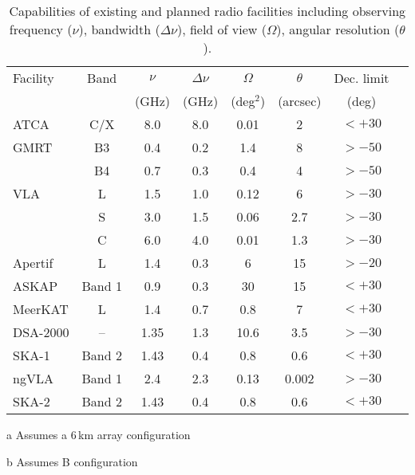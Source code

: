 \begin{table*}
    \caption[Current and future radio interferometer specifications]{Capabilities of existing and planned radio facilities including observing frequency ($\nu$), bandwidth ($\Delta\nu$), field of view ($\Omega$), angular resolution ($\theta$).}
    \label{tab:radio_facilities}
    \centering
    \begin{threeparttable}
    \begin{tabular}{lcS[table-format=1.2]S[table-format=1.1]S[table-format=2.2]S[table-format=2.3]cc}
    \hline\hline
    Facility & Band & $\nu$ & $\Delta\nu$ & $\Omega$ & $\theta$ & Dec. limit\\
     & & {(GHz)} & {(GHz)} & {(deg$^2$)} & {(arcsec)} & (deg)\\
    \hline
    ATCA &  C/X & 8.0 & 8.0 & 0.01 & 2 & $<+30$\\
    GMRT & B3 & 0.4 & 0.2 & 1.4 & 8 & $>-50$\\
    ~ & B4 & 0.7 & 0.3 & 0.4 & 4 & $>-50$\\
    VLA & L & 1.5 & 1.0 & 0.12 & 6 & $>-30$\\
    ~ & S & 3.0 & 1.5 & 0.06 & 2.7 & $>-30$\\
    ~ & C & 6.0 & 4.0 & 0.01 & 1.3 & $>-30$\\
    \rule{0pt}{3ex}Apertif & L & 1.4 & 0.3 & 6 & 15 & $>-20$\\
    ASKAP & Band 1 & 0.9 & 0.3 & 30 & 15 & $<+30$\\
    MeerKAT & L & 1.4 & 0.7 & 0.8 & 7 & $<+30$\\
    \rule{0pt}{3ex}DSA-2000 & -- & 1.35 & 1.3 & 10.6 & 3.5 & $>-30$\\
    SKA-1 & Band 2 & 1.43 & 0.4 & 0.8 & 0.6 & $<+30$\\
    ngVLA & Band 1 & 2.4 & 2.3 & 0.13 & 0.002 & $>-30$\\
    \rule{0pt}{3ex}SKA-2 & Band 2 & 1.43 & 0.4 & 0.8 & 0.6 & $<+30$\\
    \hline\hline
    \end{tabular}
    \begin{tablenotes}\footnotesize
    \item[a] Assumes a 6\,km array configuration
    \item[b] Assumes B configuration
    \end{tablenotes}
    \end{threeparttable}
\end{table*}